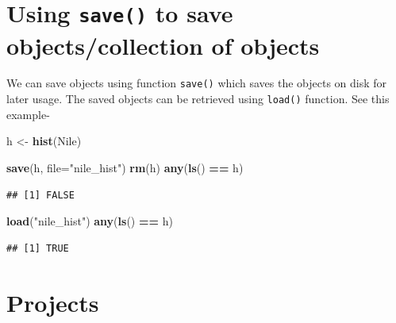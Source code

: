 \documentclass[
]{book}
\newenvironment{Shaded}{\begin{snugshade}}{\end{snugshade}}
\newcommand{\AttributeTok}[1]{\textcolor[rgb]{0.13,0.29,0.53}{#1}}
\newcommand{\FunctionTok}[1]{\textcolor[rgb]{0.13,0.29,0.53}{\textbf{#1}}}
\newcommand{\NormalTok}[1]{#1}
\newcommand{\OtherTok}[1]{\textcolor[rgb]{0.56,0.35,0.01}{#1}}
\newcommand{\SpecialCharTok}[1]{\textcolor[rgb]{0.81,0.36,0.00}{\textbf{#1}}}
\newcommand{\StringTok}[1]{\textcolor[rgb]{0.31,0.60,0.02}{#1}}
\begin{document}
\hypertarget{using-save-to-save-objectscollection-of-objects}{%
\section{\texorpdfstring{Using \texttt{save()} to save objects/collection of objects}{Using save() to save objects/collection of objects}}\label{using-save-to-save-objectscollection-of-objects}}

We can save objects using function \texttt{save()} which saves the objects on disk for later usage. The saved objects can be retrieved using \texttt{load()} function. See this example-

\begin{Shaded}
\begin{Highlighting}[]
\NormalTok{h }\OtherTok{\textless{}{-}} \FunctionTok{hist}\NormalTok{(Nile)}
\end{Highlighting}
\end{Shaded}

\begin{Shaded}
\begin{Highlighting}[]
\FunctionTok{save}\NormalTok{(h, }\AttributeTok{file=}\StringTok{"nile\_hist"}\NormalTok{)}
\FunctionTok{rm}\NormalTok{(h)}
\FunctionTok{any}\NormalTok{(}\FunctionTok{ls}\NormalTok{() }\SpecialCharTok{==} \StringTok{\textquotesingle{}h\textquotesingle{}}\NormalTok{)}
\end{Highlighting}
\end{Shaded}

\begin{verbatim}
## [1] FALSE
\end{verbatim}

\begin{Shaded}
\begin{Highlighting}[]
\FunctionTok{load}\NormalTok{(}\StringTok{"nile\_hist"}\NormalTok{)}
\FunctionTok{any}\NormalTok{(}\FunctionTok{ls}\NormalTok{() }\SpecialCharTok{==} \StringTok{\textquotesingle{}h\textquotesingle{}}\NormalTok{)}
\end{Highlighting}
\end{Shaded}

\begin{verbatim}
## [1] TRUE
\end{verbatim}

\hypertarget{projects}{%
\section{Projects}\label{projects}}
\end{document}
